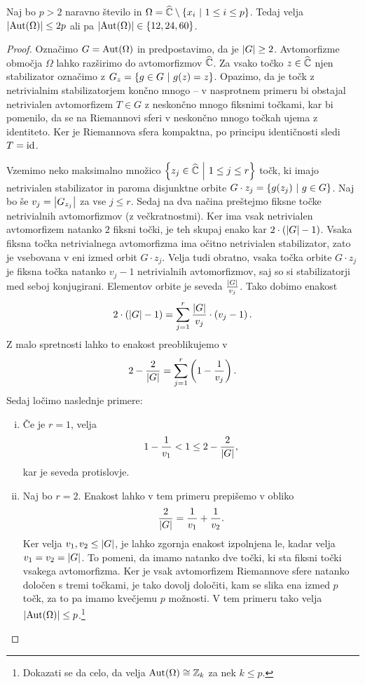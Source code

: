 \begin{trditev}
Naj bo $p > 2$ naravno število in
$\Omega = \widehat{\mathbb{C}} \setminus \left\{x_i~\middle\vert~1 \leq i \leq p\right\}$. Tedaj velja
$\left\lvert \operatorname{Aut}(\Omega)\right\rvert \leq 2p$ ali pa
$\left\lvert \operatorname{Aut}(\Omega)\right\rvert \in \left\{12, 24, 60\right\}$.
\end{trditev}

\begin{proof}
Označimo $G = \operatorname{Aut}(\Omega)$ in predpostavimo, da je
$\left\lvert G\right\rvert \geq 2$. Avtomorfizme območja $\Omega$ lahko razširimo do
avtomorfizmov $\widehat{\mathbb{C}}$. Za vsako točko $z \in \widehat{\mathbb{C}}$ njen stabilizator
označimo z $G_z = \left\{g \in G~\middle\vert~g(z) = z\right\}$. Opazimo, da je točk z
netrivialnim stabilizatorjem končno mnogo -- v nasprotnem primeru
bi obstajal netrivialen avtomorfizem $T \in G$ z neskončno mnogo
fiksnimi točkami, kar bi pomenilo, da se na Riemannovi sferi v
neskončno mnogo točkah ujema z identiteto. Ker je Riemannova sfera
kompaktna, po principu identičnosti sledi $T = \operatorname{id}$.

Vzemimo neko maksimalno množico
$\left\{z_j \in \widehat{\mathbb{C}}~\middle\vert~1 \leq j \leq r\right\}$ točk, ki imajo netrivialen
stabilizator in paroma disjunktne orbite
$G \cdot z_j = \left\{g(z_j)~\middle\vert~g \in G\right\}$. Naj bo še
$v_j = \left\lvert G_{z_j}\right\rvert$ za vse $j \leq r$. Sedaj na dva načina
preštejmo fiksne točke netrivialnih avtomorfizmov (z
večkratnostmi). Ker ima vsak netrivialen avtomorfizem natanko $2$
fiksni točki, je teh skupaj enako kar $2 \cdot \left(\left\lvert G\right\rvert - 1\right)$.
Vsaka fiksna točka netrivialnega avtomorfizma ima očitno
netrivialen stabilizator, zato je vsebovana v eni izmed orbit
$G \cdot z_j$. Velja tudi obratno, vsaka točka orbite $G \cdot z_j$
je fiksna točka natanko $v_j - 1$ netrivialnih avtomorfizmov, saj
so si stabilizatorji med seboj konjugirani. Elementov orbite je
seveda $\frac{\left\lvert G\right\rvert}{v_j}$. Tako dobimo enakost
\[
2 \cdot \left(\left\lvert G\right\rvert - 1\right) =
\sum_{j=1}^r \frac{\left\lvert G\right\rvert}{v_j} \cdot \left(v_j - 1\right).
\]
Z malo spretnosti lahko to enakost preoblikujemo v
\[
2 - \frac{2}{\left\lvert G\right\rvert} = \sum_{j=1}^r \left(1 - \frac{1}{v_j}\right).
\]
Sedaj ločimo naslednje primere:

\begin{enumerate}[i)]
\item Če je $r = 1$, velja
\[
1 - \frac{1}{v_1} < 1 \leq 2 - \frac{2}{\left\lvert G\right\rvert},
\]
kar je seveda protislovje.

\item Naj bo $r = 2$. Enakost lahko v tem primeru prepišemo v
obliko
\[
\frac{2}{\left\lvert G\right\rvert} = \frac{1}{v_1} + \frac{1}{v_2}.
\]
Ker velja $v_1, v_2 \leq \left\lvert G\right\rvert$, je lahko zgornja enakost
izpolnjena le, kadar velja $v_1 = v_2 = \left\lvert G\right\rvert$. To pomeni, da
imamo natanko dve točki, ki sta fiksni točki vsakega avtomorfizma.
Ker je vsak avtomorfizem Riemannove sfere natanko določen s tremi
točkami, je tako dovolj določiti, kam se slika ena izmed $p$ točk,
za to pa imamo kvečjemu $p$ možnosti. V tem primeru tako velja
$\left\lvert \operatorname{Aut}(\Omega)\right\rvert \leq p$.\footnote{Dokazati se da celo, da velja
$\operatorname{Aut}(\Omega) \cong \mathbb{Z}_k$ za nek $k \leq p$.}


\end{enumerate}
\end{proof}
